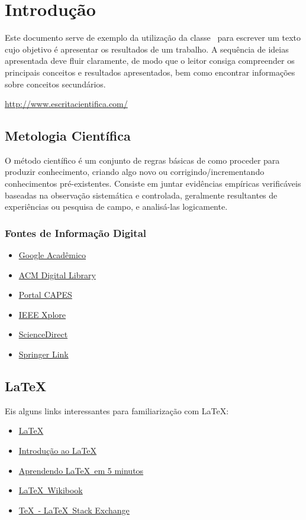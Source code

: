 \chapter{Introdução}%
Este documento serve de exemplo da utilização da classe \unbcic\ para escrever um texto cujo objetivo é apresentar os resultados de um trabalho. A sequência de ideias apresentada deve fluir claramente, de modo que o leitor consiga compreender os principais conceitos e resultados apresentados, bem como encontrar informações sobre conceitos secundários.

\url{http://www.escritacientifica.com/}

\section{Metologia Científica}
O método científico é um conjunto de regras básicas de como proceder para produzir conhecimento, criando algo novo ou corrigindo/incrementando conhecimentos pré-existentes. Consiste em juntar evidências empíricas verificáveis baseadas na observação sistemática e controlada, geralmente resultantes de experiências ou pesquisa de campo, e analisá-las logicamente. 

\subsection{Fontes de Informação Digital}
\begin{itemize}
	\item\href{http://scholar.google.com.br/}{Google Acadêmico}
	\item\href{http://dl.acm.org/}{ACM Digital Library}
	\item\href{http://www.periodicos.capes.gov.br/}{Portal CAPES}
	\item\href{http://ieeexplore.ieee.org/Xplore/home.jsp}{IEEE Xplore}
	\item\href{http://www.sciencedirect.com/}{ScienceDirect}
	\item\href{http://link.springer.com/}{Springer Link}
\end{itemize}

\section{\LaTeX}
Eis alguns links interessantes para familiarização com \LaTeX:
\begin{itemize}
	\item \href{http://www.latex-project.org/}{\LaTeX}
	\item \href{http://latexbr.blogspot.com.br/2010/04/introducao-ao-latex.html}{Introdução ao LaTeX}
	\item \href{https://bitbucket.org/rg3915/latex/downloads/aprendendo_latex_em_5_min.pdf}{Aprendendo \LaTeX\ em 5 minutos}
	\item \href{http://en.wikibooks.org/wiki/LaTeX}{\LaTeX\ Wikibook}
	\item \href{http://tex.stackexchange.com/}{\TeX\ - \LaTeX\ Stack Exchange}
\end{itemize}



